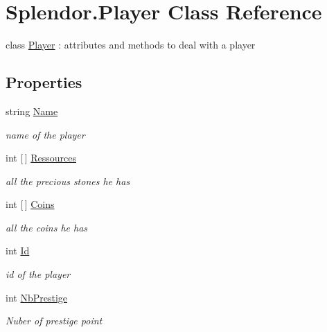 \hypertarget{class_splendor_1_1_player}{}\section{Splendor.\+Player Class Reference}
\label{class_splendor_1_1_player}


class \mbox{\hyperlink{class_splendor_1_1_player}{Player}} \+: attributes and methods to deal with a player  


\subsection*{Properties}
\begin{DoxyCompactItemize}
\item 
string \mbox{\hyperlink{class_splendor_1_1_player_a15abd489e523e11b6beb4b186783e47f}{Name}}
\begin{DoxyCompactList}\small\item\em name of the player \end{DoxyCompactList}\item 
int \mbox{[}$\,$\mbox{]} \mbox{\hyperlink{class_splendor_1_1_player_a1c5ccd2470e3bbc84e9a156bc323bfd0}{Ressources}}
\begin{DoxyCompactList}\small\item\em all the precious stones he has \end{DoxyCompactList}\item 
int \mbox{[}$\,$\mbox{]} \mbox{\hyperlink{class_splendor_1_1_player_a729fa09f28e378e7934f3ae54ea463e9}{Coins}}
\begin{DoxyCompactList}\small\item\em all the coins he has \end{DoxyCompactList}\item 
int \mbox{\hyperlink{class_splendor_1_1_player_a5616e3562be3e8800f9e959e7cf75194}{Id}}
\begin{DoxyCompactList}\small\item\em id of the player \end{DoxyCompactList}\item 
int \mbox{\hyperlink{class_splendor_1_1_player_ad92459d327fa7cc546259931af417aa1}{Nb\+Prestige}}
\begin{DoxyCompactList}\small\item\em Nuber of prestige point \end{DoxyCompactList}\end{DoxyCompactItemize}


